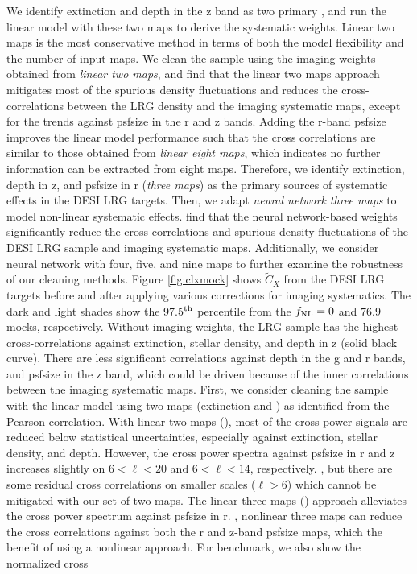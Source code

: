 We identify extinction and depth in the z band as two primary , and run the linear model with these two maps to derive the systematic weights. Linear two maps is the most conservative  method in terms of both the model flexibility and the number of input maps. We clean the sample using the imaging weights obtained from \textit{linear two maps}, and find that the linear two maps approach mitigates most of the spurious density fluctuations and reduces the cross-correlations between the LRG density and the imaging systematic maps, except for the trends against psfsize in the r and z bands. Adding the r-band psfsize improves the linear model performance such that the cross correlations are similar to those obtained from \textit{linear eight maps}, which indicates no further information can be extracted from eight maps. Therefore, we identify extinction, depth in z, and psfsize in r (\textit{three maps}) as the primary sources of systematic effects in the DESI LRG targets. Then, we adapt \textit{neural network three maps} to model non-linear systematic effects.  find that the neural network-based weights significantly reduce the cross correlations and spurious density fluctuations of the DESI LRG sample and imaging systematic maps. Additionally, we consider neural network with four, five, and nine maps to further examine the robustness of our cleaning methods. Figure \ref{fig:clxmock} shows $\tilde{C}_{X}$ from the DESI LRG targets before and after applying various corrections for imaging systematics. The dark and light shades show the 97.5$^{\rm th}$ percentile from the $f_{\rm NL}=0$ and $76.9$ mocks, respectively. Without imaging weights, the LRG sample has the highest cross-correlations against extinction, stellar density, and depth in z (solid black curve). There are less significant correlations against depth in the g and r bands, and psfsize in the z band, which could be driven because of the inner correlations between the imaging systematic maps. First, we consider cleaning the sample with the linear model using two maps (extinction and ) as identified from the Pearson correlation. With linear two maps (), most of the cross power signals are reduced below statistical uncertainties, especially against extinction, stellar density, and depth. However, the cross power spectra against psfsize in r and z increases slightly on $6<\ell<20$ and $6<\ell<14$, respectively. , but there are some residual cross correlations on smaller scales ($\ell > 6$) which cannot be mitigated with our set of two maps. The linear three maps () approach alleviates the cross power spectrum against psfsize in r. , nonlinear three maps  can reduce the cross correlations against both the r and z-band psfsize maps, which  the benefit of using a nonlinear approach. For benchmark, we also show the normalized cross 